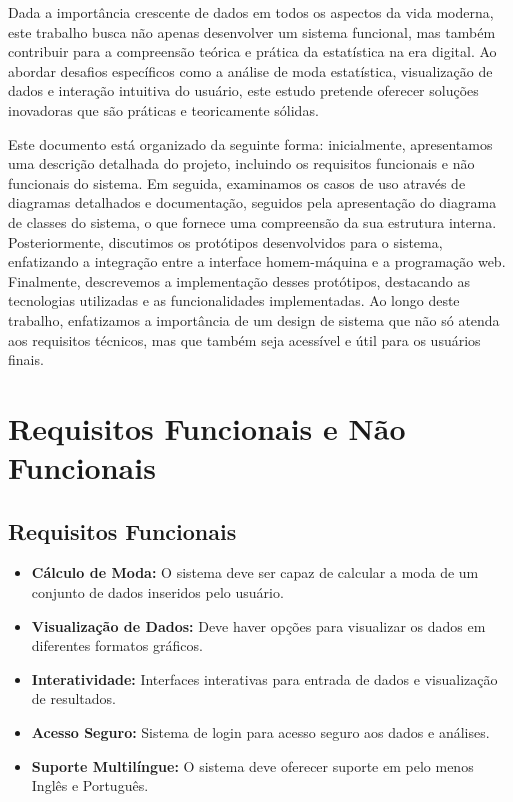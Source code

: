 \documentclass[12pt,a4paper]{article}
\begin{document}
Dada a importância crescente de dados em todos os aspectos da vida moderna, este trabalho busca não apenas desenvolver um sistema funcional, mas também contribuir para a compreensão teórica e prática da estatística na era digital. Ao abordar desafios específicos como a análise de moda estatística, visualização de dados e interação intuitiva do usuário, este estudo pretende oferecer soluções inovadoras que são práticas e teoricamente sólidas.

Este documento está organizado da seguinte forma: inicialmente, apresentamos uma descrição detalhada do projeto, incluindo os requisitos funcionais e não funcionais do sistema. Em seguida, examinamos os casos de uso através de diagramas detalhados e documentação, seguidos pela apresentação do diagrama de classes do sistema, o que fornece uma compreensão da sua estrutura interna. Posteriormente, discutimos os protótipos desenvolvidos para o sistema, enfatizando a integração entre a interface homem-máquina e a programação web. Finalmente, descrevemos a implementação desses protótipos, destacando as tecnologias utilizadas e as funcionalidades implementadas. Ao longo deste trabalho, enfatizamos a importância de um design de sistema que não só atenda aos requisitos técnicos, mas que também seja acessível e útil para os usuários finais.

\newpage
\section{Requisitos Funcionais e Não Funcionais}

\subsection{Requisitos Funcionais}
\begin{itemize}
    \item \textbf{Cálculo de Moda:} O sistema deve ser capaz de calcular a moda de um conjunto de dados inseridos pelo usuário.
    \item \textbf{Visualização de Dados:} Deve haver opções para visualizar os dados em diferentes formatos gráficos.
    \item \textbf{Interatividade:} Interfaces interativas para entrada de dados e visualização de resultados.
    \item \textbf{Acesso Seguro:} Sistema de login para acesso seguro aos dados e análises.
    \item \textbf{Suporte Multilíngue:} O sistema deve oferecer suporte em pelo menos Inglês e Português.
\end{itemize}
\end{document}
